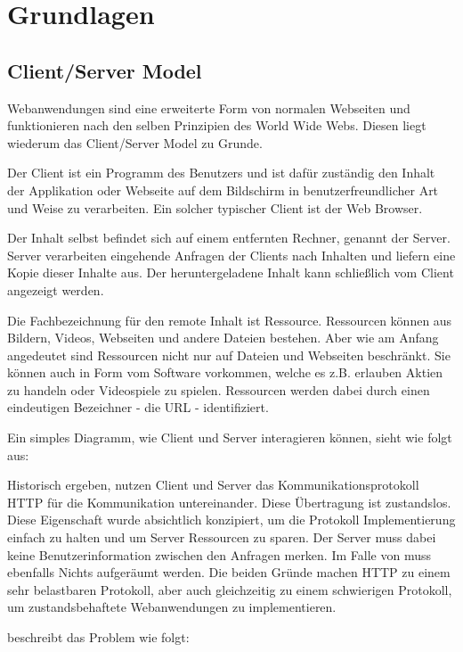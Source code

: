 \chapter{Grundlagen}

\section{Client/Server Model}
\label{sec:client_server}

Webanwendungen sind eine erweiterte Form von normalen Webseiten und funktionieren nach den selben Prinzipien des World Wide Webs. Diesen liegt wiederum das Client/Server Model zu Grunde.

Der Client ist ein Programm des Benutzers und ist dafür zuständig den Inhalt der Applikation oder Webseite auf dem Bildschirm in benutzerfreundlicher Art und Weise zu verarbeiten. Ein solcher typischer Client ist der Web Browser.

Der Inhalt selbst befindet sich auf einem entfernten Rechner, genannt der Server. Server verarbeiten eingehende Anfragen der Clients nach Inhalten und liefern eine Kopie dieser Inhalte aus. Der heruntergeladene Inhalt kann schließlich vom Client angezeigt werden.

Die Fachbezeichnung für den remote Inhalt ist Ressource. Ressourcen können aus Bildern, Videos, Webseiten und andere Dateien bestehen. Aber wie am Anfang angedeutet sind Ressourcen nicht nur auf Dateien und Webseiten beschränkt. Sie können auch in Form vom Software vorkommen, welche es z.B. erlauben Aktien zu handeln oder Videospiele zu spielen. Ressourcen werden dabei durch einen eindeutigen Bezeichner - die URL - identifiziert.

Ein simples Diagramm, wie Client und Server interagieren können, sieht wie folgt aus:

Historisch ergeben, nutzen Client und Server das Kommunikationsprotokoll HTTP für die Kommunikation untereinander. Diese Übertragung ist zustandslos. Diese Eigenschaft wurde absichtlich konzipiert, um die Protokoll Implementierung einfach zu halten und um Server Ressourcen zu sparen. Der Server muss dabei keine Benutzerinformation zwischen den Anfragen merken. Im Falle von muss ebenfalls Nichts aufgeräumt werden. Die beiden Gründe machen HTTP zu einem sehr belastbaren Protokoll, aber auch gleichzeitig zu einem schwierigen Protokoll, um zustandsbehaftete Webanwendungen zu implementieren.

\citep[Background]{launchschool} beschreibt das Problem wie folgt:

